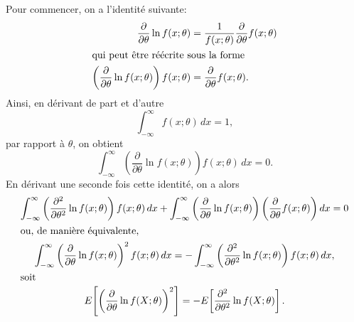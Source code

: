 \begin{solution}{3.17}
    Pour commencer, on a l'identité suivante:
    \begin{align*}
      \frac{\partial}{\partial \theta} \ln f(x;\theta) &=
      \frac{1}{f(x;\theta)}\frac{\partial}{\partial \theta}
      f(x;\theta) \\
      \intertext{qui peut être réécrite sous la forme}
      \left(
        \frac{\partial}{\partial \theta} \ln f(x;\theta)
      \right) f(x;\theta)
      &= \frac{\partial}{\partial \theta} f(x;\theta).
    \end{align*}
    Ainsi, en dérivant de part et d'autre
    \begin{displaymath}
      \int_{-\infty}^\infty f(x; \theta)\, dx = 1,
    \end{displaymath}
    par rapport à $\theta$, on obtient
    \begin{equation*}
      \int_{-\infty}^\infty
      \left(
        \frac{\partial}{\partial \theta} \ln f(x;\theta)
        \right) f(x;\theta)\, dx = 0.
    \end{equation*}
    En dérivant une seconde fois cette identité, on a alors
    \begin{gather*}
      \int_{-\infty}^\infty
      \left(
        \frac{\partial^2}{\partial \theta^2} \ln f(x;\theta)
      \right) f(x;\theta)\, dx +
      \int_{-\infty}^\infty
      \left(
        \frac{\partial}{\partial \theta} \ln f(x;\theta)
      \right)
      \left(
        \frac{\partial}{\partial \theta} f(x;\theta)
      \right) dx = 0 \\
      \intertext{ou, de manière équivalente,}
      \int_{-\infty}^\infty
      \left(
        \frac{\partial}{\partial \theta} \ln f(x;\theta)
      \right)^2
      f(x;\theta)\, dx =
      - \int_{-\infty}^\infty
      \left(
        \frac{\partial^2}{\partial \theta^2} \ln f(x;\theta)
      \right) f(x;\theta)\, dx, \\
      \intertext{soit}
      E\! \left[ \left( \frac{\partial}{\partial \theta}
          \ln f(X; \theta) \right)^2 \right] =
      - E\! \left[ \frac{\partial^2}{\partial \theta^2}
        \ln f(X; \theta) \right].
    \end{gather*}
  
\end{solution}
